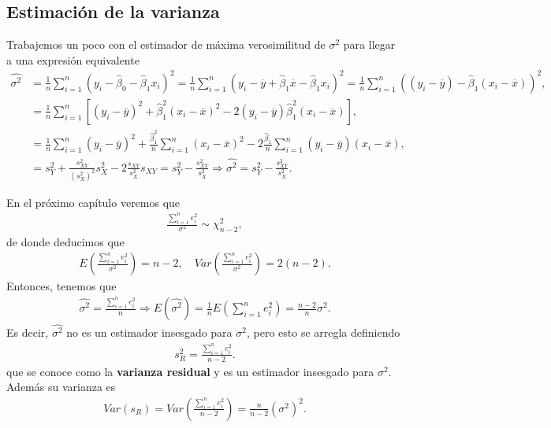 \subsection{Estimación de la varianza}
Trabajemos un poco con el estimador de máxima verosimilitud de $\sigma^2$ para llegar a una expresión equivalente
\begin{align*}
    \widehat{\sigma^2} & = \frac{1}{n} \sum_{i=1}^{n} (y_i - \widehat{\beta}_0 - \widehat{\beta}_1 x_i)^2 = \frac{1}{n} \sum_{i=1}^{n} (y_i - \overline{y} + \widehat{\beta}_1 \overline{x} - \widehat{\beta}_1 x_i)^2  = \frac{1}{n} \sum_{i=1}^{n}((y_i - \overline{y}) - \widehat{\beta}_1(x_i - \overline{x}))^2, \\
                       & = \frac{1}{n} \sum_{i=1}^{n}[(y_i - \overline{y})^2 + \widehat{\beta}_1^2(x_i - \overline{x})^2 - 2(y_i - \overline{y})\widehat{\beta}_1^2(x_i - \overline{x})],                                                                                                                             \\
                       & = \frac{1}{n} \sum_{i=1}^{n}(y_i - \overline{y})^2 + \frac{\widehat{\beta}_1^2}{n} \sum_{i=1}^{n} (x_i-\overline{x})^2 - 2\frac{\widehat{\beta}_1}{n} \sum_{i=1}^{n} (y_i - \overline{y})(x_i-\overline{x}),                                                                                 \\
                       & = s_Y^2 + \frac{s_{XY}^2}{(s_X^2)^2}s_X^2 - 2\frac{s_{XY}}{s_X^2} s_{XY} = s_Y^2 - \frac{s_{XY}^2}{s_X^2} \Longrightarrow \boxed{
        \widehat{\sigma^2} = s_Y^2 - \frac{s_{XY}^2}{s_X^2}.
    }
\end{align*}
\begin{obs}
    En el próximo capítulo veremos que
    \begin{align*}
        \frac{\sum_{i=1}^{n} e_i^2}{\sigma^2} \sim \chi_{n-2}^2,
    \end{align*}
    de donde deducimos que
    \begin{align*}
        E \left( \frac{\sum_{i=1}^{n} e_i^2}{\sigma^2} \right) = n-2, \quad Var\left( \frac{\sum_{i=1}^{n} e_i^2}{\sigma^2} \right) = 2(n-2).
    \end{align*}
    Entonces, tenemos que
    \begin{align*}
        \widehat{\sigma^2} = \frac{\sum_{i=1}^{n} e_i^2}{n} \Longrightarrow E\left( \widehat{\sigma^2}\right) = \frac{1}{n}E\left( \sum_{i=1}^{n} e_i^2\right) = \frac{n-2}{n}\sigma^2.
    \end{align*}
    Es decir, $\widehat{\sigma^2}$ no es un estimador insesgado para $\sigma^2$, pero esto se arregla definiendo
    \begin{align*}
        \boxed{
            s_R^2 = \frac{\sum_{i=1}^{n} e_i^2}{n-2}.
        }
    \end{align*}
    que se conoce como la \textbf{varianza residual} y es un estimador insesgado para $\sigma^2$. Además su varianza es
    \begin{align*}
        Var(s_R) = Var\left( \frac{\sum_{i=1}^{n} e_i^2}{n-2} \right) = \frac{n}{n-2} \left(\sigma^2\right)^2.
    \end{align*}
\end{obs}

